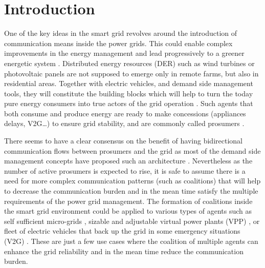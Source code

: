 \documentclass[conference]{IEEEtran}
\begin{document}




\IEEEpeerreviewmaketitle



\section{Introduction}
\label{sec:introduction}
One of the key ideas in the smart grid revolves around the introduction of communication means inside the power grids. This could enable complex improvements in the energy management and lead progressively to a greener energetic system \cite{Ramchurn} \cite{WuHamedHuangBook2011}. Distributed energy resources (DER) such as wind turbines or photovoltaic panels are not supposed to emerge only in remote farms, but also in residential areas. Together with electric vehicles, and demand side management tools, they will constitute the building blocks which will help to turn the today pure energy consumers into true actors of the grid operation \cite{Ramchurn}. Such agents that both consume and produce energy are ready to make concessions (appliances delays, V2G…) to ensure grid stability, and are commonly called prosumers \cite{Rathnayaka2012} \cite{Ramchurn}.

There seems to have a clear consensus on the benefit of having bidirectional communication flows between prosumers and the grid as most of the demand side management concepts have proposed such an architecture \cite{WuHamedHuangBook2011}. Nevertheless as the number of active prosumers is expected to rise, it is safe to assume there is a need for more complex communication patterns (such as coalitions) that will help to decrease the communication burden and in the mean time satisfy the multiple requirements of the power grid management. The formation of coalitions inside the smart grid environment could be applied to various types of agents such as self sufficient micro-grids \cite{Pahwa}, sizable and adjustable virtual power plants (VPP) \cite{Braun} \cite{Ramchurn}, or fleet of electric vehicles that back up the grid in some emergency situations (V2G) \cite{Ramchurn}. These are just a few use cases where the coalition of multiple agents can enhance the grid reliability and in the mean time reduce the communication burden.
\end{document}
